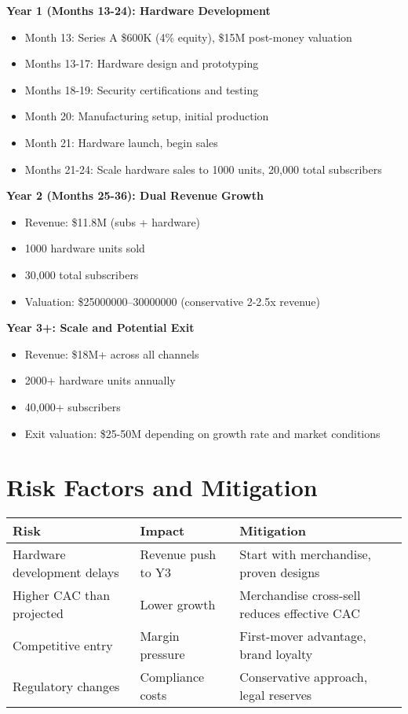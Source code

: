 \documentclass[11pt]{article}
\newcommand{\hwCustomersYearTwo}{1000}
\newcommand{\hwCustomersYearThree}{2000}
\newcommand{\seriesAEquity}{4}
\newcommand{\valuationRangeLow}{25000000}
\newcommand{\valuationRangeHigh}{30000000}
\begin{document}
\textbf{Year 1 (Months 13-24): Hardware Development}
\begin{itemize}
  \item Month 13: Series A \$600K (\seriesAEquity\% equity), \$15M post-money valuation
  \item Months 13-17: Hardware design and prototyping
  \item Months 18-19: Security certifications and testing
  \item Month 20: Manufacturing setup, initial production
  \item Month 21: Hardware launch, begin sales
  \item Months 21-24: Scale hardware sales to \hwCustomersYearTwo{} units, 20,000 total subscribers
\end{itemize}

\textbf{Year 2 (Months 25-36): Dual Revenue Growth}
\begin{itemize}
  \item Revenue: \$11.8M (subs + hardware)
  \item \hwCustomersYearTwo{} hardware units sold
  \item 30,000 total subscribers
  \item Valuation: \$\num{\valuationRangeLow}--\num{\valuationRangeHigh} (conservative 2-2.5x revenue)
\end{itemize}

\textbf{Year 3+: Scale and Potential Exit}
\begin{itemize}
  \item Revenue: \$18M+ across all channels
  \item \hwCustomersYearThree+ hardware units annually
  \item 40,000+ subscribers
  \item Exit valuation: \$25-50M depending on growth rate and market conditions
\end{itemize}

\section{Risk Factors and Mitigation}

\begin{table}[H]
\centering
\begin{tabularx}{\linewidth}{l X X}
\toprule
Risk & Impact & Mitigation \\\midrule
Hardware development delays & Revenue push to Y3 & Start with merchandise, proven designs \\
Higher CAC than projected & Lower growth & Merchandise cross-sell reduces effective CAC \\
Competitive entry & Margin pressure & First-mover advantage, brand loyalty \\
Regulatory changes & Compliance costs & Conservative approach, legal reserves \\
\bottomrule
\end{tabularx}
\end{table}

\printbibliography
\end{document}

